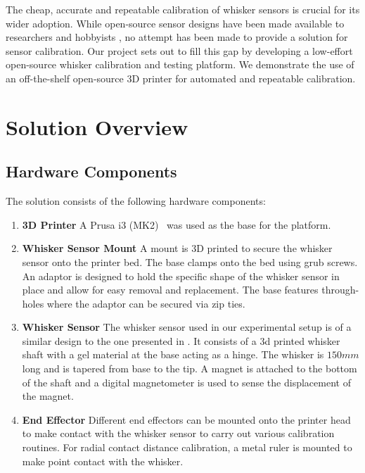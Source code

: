 \documentclass[runningheads]{llncs}
\begin{document}
The cheap, accurate and repeatable calibration of whisker sensors is crucial for its wider adoption. While open-source sensor designs have been made available to researchers and hobbyists \cite{Paparas_Ratatouille-Whiskers_Ratatouille-Whisker_Ratatouille_Whisker_2024}, no attempt has been made to provide a solution for sensor calibration. Our project sets out to fill this gap by developing a low-effort open-source whisker calibration and testing platform. We demonstrate the use of an off-the-shelf open-source 3D printer for automated and repeatable calibration.

\section{Solution Overview}

\subsection{Hardware Components}

The solution consists of the following hardware components:

\begin{enumerate}
    \item \textbf{3D Printer} A Prusa i3 (MK2)~\cite{OriginalPrusaI3} was used as the base for the platform.

    \item \textbf{Whisker Sensor Mount} A mount is 3D printed to secure the whisker sensor onto the printer bed. The base clamps onto the bed using grub screws. An adaptor is designed to hold the specific shape of the whisker sensor in place and allow for easy removal and replacement. The base features through-holes where the adaptor can be secured via zip ties.

    \item \textbf{Whisker Sensor} The whisker sensor used in our experimental setup is of a similar design to the one presented in \cite{Paparas_Ratatouille-Whiskers_Ratatouille-Whisker_Ratatouille_Whisker_2024}. It consists of a 3d printed whisker shaft with a gel material at the base acting as a hinge. The whisker is $150 mm$ long and is tapered from base to the tip. A magnet is attached to the bottom of the shaft and a digital magnetometer is used to sense the displacement of the magnet. 

    \item \textbf{End Effector} Different end effectors can be mounted onto the printer head to make contact with the whisker sensor to carry out various calibration routines. For radial contact distance calibration, a metal ruler is mounted to make point contact with the whisker.
\end{enumerate}
\end{document}
